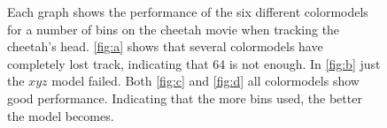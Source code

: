 \documentclass[11pt]{article}
\begin{document}
\begin{figure}[!ht]
{\label{fig:c}
}
\caption{Each graph shows the performance of the six different colormodels for
a number of bins on the cheetah movie when tracking the cheetah's head.
\ref{fig:a} shows that several colormodels have completely lost track,
indicating that $64$ is not enough. In \ref{fig:b} just the $xyz$ model failed.
Both \ref{fig:c} and \ref{fig:d} all colormodels show good performance.
Indicating that the more bins used, the better the model becomes.}
\label{fig:cheetah}
\end{figure}
\end{document}
